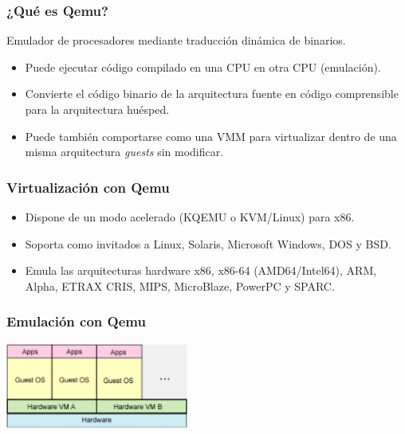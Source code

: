 \documentclass{beamer}
\begin{document}
\begin{frame}
\frametitle{¿Qué es Qemu?}

\begin{definition}
Emulador de procesadores mediante traducción dinámica de binarios.
\end{definition}

\begin{itemize}
\item Puede ejecutar código compilado en una CPU en otra CPU (\alert{emulación}). 
\item Convierte el código binario de la arquitectura fuente en código comprensible para la arquitectura huésped.
\item Puede también comportarse como una VMM para \alert{virtualizar} dentro de una misma arquitectura \textit{guests} sin modificar.
\end{itemize}

\end{frame}

\begin{frame}
\frametitle{Virtualización con Qemu}

\begin{itemize}
\item Dispone de un modo acelerado (KQEMU o KVM/Linux) para x86.
\item Soporta como invitados a  Linux, Solaris, Microsoft Windows, DOS y BSD.
\item Emula las arquitecturas hardware x86, x86-64 (AMD64/Intel64), ARM, Alpha, ETRAX CRIS, MIPS, MicroBlaze, PowerPC y SPARC. 
\end{itemize}

\end{frame}


\begin{frame}
\frametitle{Emulación con Qemu}

\begin{center}
\includegraphics[width=6cm,clip=false]{figs/emulation.png}
\end{center}

\end{frame}
\end{document}
